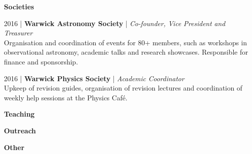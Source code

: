 \documentclass[10pt,a4paper]{altacv}
\begin{document}
\normalsize \textbf{Societies}

\medskip

\small 2016 | \textbf{Warwick Astronomy Society} | \textit{Co-founder, Vice President and Treasurer} \\
Organisation and coordination of events for 80+ members, such as workshops in observational astronomy, academic talks and research showcases.
Responsible for finance and sponsorship.

\divider

\small 2016 | \textbf{Warwick Physics Society} | \textit{Academic Coordinator} \\
Upkeep of revision guides, organisation of revision lectures and coordination of weekly help sessions at the Physics Caf{\'e}.


\medskip

\normalsize \textbf{Teaching}

\medskip

\normalsize \textbf{Outreach}

\medskip

\normalsize \textbf{Other}
\end{document}
